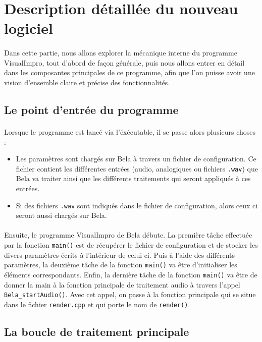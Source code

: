 \section{Description détaillée du nouveau logiciel}
\paragraph{}
Dans cette partie, nous allons explorer la mécanique interne du programme VisualImpro, tout d'abord de façon générale, puis nous allons entrer en détail dans les composantes principales de ce programme, afin que l'on puisse avoir une vision d'ensemble claire et précise des fonctionnalités. 
\subsection{Le point d'entrée du programme}
\paragraph{}
Lorsque le programme est lancé via l'éxécutable, il se passe alors plusieurs choses :
\begin{itemize}
    \item Les paramètres sont chargés sur Bela à travers un fichier de configuration. Ce fichier contient les différentes entrées (audio, analogiques ou fichiers \verb!.wav!) que Bela va traiter ainsi que les différents traitements qui seront appliqués à ces entrées. 
    \item Si des fichiers \verb!.wav! sont indiqués dans le fichier de configuration, alors ceux ci seront aussi chargés sur Bela.
\end{itemize}
\paragraph{}
Ensuite, le programme VisualImpro de Bela débute. La première tâche effectuée par la fonction \verb!main()! est de récupérer le fichier de configuration et de stocker les divers paramètres écrits à l'intérieur de celui-ci. Puis à l'aide des différents paramètres, la deuxième tâche de la fonction \verb!main()!
va être d'initialiser les éléments correspondants. Enfin, la dernière tâche de la fonction \verb!main()! va être de donner la main à la fonction principale de traitement audio à travers l'appel \verb!Bela_startAudio()!. Avec cet appel, on passe à la fonction principale qui se situe dans le fichier \verb!render.cpp! et qui porte le nom de \verb!render()!.
\subsection{La boucle de traitement principale}
